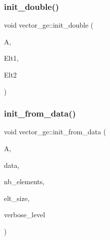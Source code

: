 \subsubsection{\texorpdfstring{init\+\_\+double()}{init\_double()}}
{\footnotesize\ttfamily void vector\+\_\+ge\+::init\+\_\+double (\begin{DoxyParamCaption}\item[{\mbox{\hyperlink{classaction}{action}} $\ast$}]{A,  }\item[{\mbox{\hyperlink{galois_8h_a09fddde158a3a20bd2dcadb609de11dc}{I\+NT}} $\ast$}]{Elt1,  }\item[{\mbox{\hyperlink{galois_8h_a09fddde158a3a20bd2dcadb609de11dc}{I\+NT}} $\ast$}]{Elt2 }\end{DoxyParamCaption})}

\mbox{\label{classvector__ge_a44b1669e41321b41d93fb5cf957b8bc5}} 
\subsubsection{\texorpdfstring{init\+\_\+from\+\_\+data()}{init\_from\_data()}}
{\footnotesize\ttfamily void vector\+\_\+ge\+::init\+\_\+from\+\_\+data (\begin{DoxyParamCaption}\item[{\mbox{\hyperlink{classaction}{action}} $\ast$}]{A,  }\item[{\mbox{\hyperlink{galois_8h_a09fddde158a3a20bd2dcadb609de11dc}{I\+NT}} $\ast$}]{data,  }\item[{\mbox{\hyperlink{galois_8h_a09fddde158a3a20bd2dcadb609de11dc}{I\+NT}}}]{nb\+\_\+elements,  }\item[{\mbox{\hyperlink{galois_8h_a09fddde158a3a20bd2dcadb609de11dc}{I\+NT}}}]{elt\+\_\+size,  }\item[{\mbox{\hyperlink{galois_8h_a09fddde158a3a20bd2dcadb609de11dc}{I\+NT}}}]{verbose\+\_\+level }\end{DoxyParamCaption})}

\mbox{\label{classvector__ge_a27fafaa0f2f225fe11281d401b8a8239}} 
